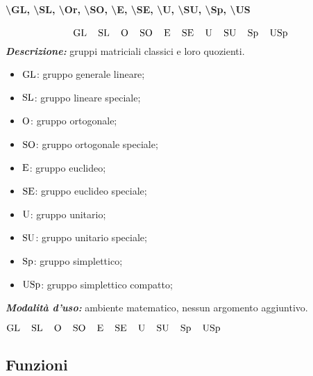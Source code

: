 \paragraph{\textbackslash GL, \textbackslash SL, \textbackslash Or, \textbackslash SO, \textbackslash E, \textbackslash SE, \textbackslash U, \textbackslash SU, \textbackslash Sp, \textbackslash US}
\begin{equation*}
	\operatorname{GL}\quad\operatorname{SL}\quad\operatorname{O}\quad\operatorname{SO}\quad\operatorname{E}\quad\operatorname{SE}\quad\operatorname{U}\quad\operatorname{SU}\quad\operatorname{Sp}\quad\operatorname{USp}
\end{equation*}
\textbf{\textit{Descrizione:}} gruppi matriciali classici e loro quozienti.
\begin{multicols}{2}
	\begin{itemize}
		\item $\operatorname{GL}$: gruppo generale lineare;
		\item $\operatorname{SL}$: gruppo lineare speciale;
		\item $\operatorname{O}$: gruppo ortogonale;
		\item $\operatorname{SO}$: gruppo ortogonale speciale;
		\item $\operatorname{E}$: gruppo euclideo;
		\item $\operatorname{SE}$: gruppo euclideo speciale;
		\item $\operatorname{U}$: gruppo unitario;
		\item $\operatorname{SU}$: gruppo unitario speciale;
		\item $\operatorname{Sp}$: gruppo simplettico;
		\item $\operatorname{USp}$: gruppo simplettico compatto;
	\end{itemize}
\end{multicols}
\noindent\textbf{\textit{Modalità d'uso:}} ambiente matematico, nessun argomento aggiuntivo.
\begin{codelatex}
$\operatorname{GL}\quad\operatorname{SL}\quad\operatorname{O}\quad\operatorname{SO}\quad\operatorname{E}\quad\operatorname{SE}\quad\operatorname{U}\quad\operatorname{SU}\quad\operatorname{Sp}\quad\operatorname{USp}$
\end{codelatex}
\subsection{Funzioni}
